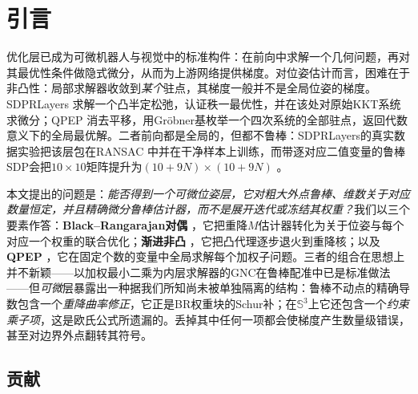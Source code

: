 \section{引言}

优化层已成为可微机器人与视觉中的标准构件：在前向中求解一个几何问题，再对其最优性条件做隐式微分，从而为上游网络提供梯度\cite{holmes2025sdpr,pineda2022theseus,chen2020bpn}。对位姿估计而言，困难在于非凸性：局部求解器收敛到\emph{某个}驻点，其梯度一般并不是全局位姿的梯度。SDPRLayers \cite{holmes2025sdpr}求解一个凸半定松弛，认证秩一最优性，并在该处对原始KKT系统求微分；QPEP \cite{wu2022qpep}消去平移，用Gr\"obner基枚举一个四次系统的全部驻点，返回代数意义下的全局最优解。二者前向都是全局的，但都不鲁棒：SDPRLayers的真实数据实验把该层包在RANSAC \cite{fischler1981ransac}中并在干净样本上训练，而带逐对应二值变量的鲁棒SDP会把$10\times10$矩阵提升为$(10+9N)\times(10+9N)$ \cite{holmes2025sdpr}。

本文提出的问题是：\emph{能否得到一个可微位姿层，它对粗大外点鲁棒、维数关于对应数量恒定，并且精确微分鲁棒估计器，而不是展开迭代或冻结其权重？}我们以三个要素作答：\textbf{Black--Rangarajan对偶} \cite{black1996br}，它把重降$M$估计器转化为关于位姿与每个对应一个权重的联合优化；\textbf{渐进非凸} \cite{yang2020gnc,yang2020teaser}，它把凸代理逐步退火到重降核；以及\textbf{QPEP} \cite{wu2022qpep}，它在固定个数的变量中全局求解每个加权子问题。三者的组合在思想上并不新颖——以加权最小二乘为内层求解器的GNC在鲁棒配准中已是标准做法 \cite{yang2020gnc,yang2020teaser}——但\emph{可微}层暴露出一种据我们所知尚未被单独隔离的结构：鲁棒不动点的精确导数包含一个\emph{重降曲率修正}，它正是BR权重块的Schur补；在$\mathbb{S}^3$上它还包含一个\emph{约束乘子项}，这是欧氏公式所遗漏的。丢掉其中任何一项都会使梯度产生数量级错误，甚至对边界外点翻转其符号。

\subsection{贡献}

